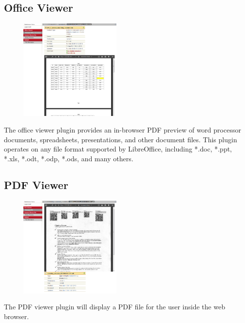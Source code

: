 \documentclass[10pt]{article}
\begin{document}
\endgroup

\hfill \break
\hfill \break
\hfill \break
\hfill \break
\hfill \break
\hfill \break
\hfill \break
\hfill \break
\hfill \break
\hfill \break

\begingroup
\setlength\intextsep{0pt}
\subsection{Office Viewer}
\begin{figure}
		\includegraphics[width=0.45\textwidth]{Office_Viewer.png}
\end{figure}
The office viewer plugin provides an in-browser PDF preview of word processor documents, spreadsheets, presentations, and other document files.  This plugin operates on any file format supported by LibreOffice, including *.doc, *.ppt, *.xls, *.odt, *.odp, *.ods, and many others.

\endgroup

\clearpage
\begingroup
\setlength\intextsep{0pt}
\subsection{PDF Viewer}
\begin{figure}
		\includegraphics[width=0.45\textwidth]{PDF_Viewer.png}
\end{figure}
The PDF viewer plugin will display a PDF file for the user inside the web browser.
\end{document}

